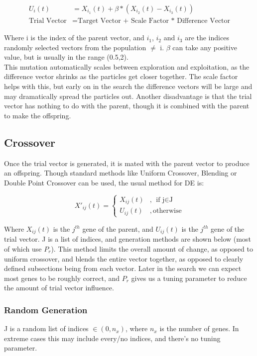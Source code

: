 \begin{align}
    U_i(t) &= X_{i_1}(t) + \beta * (X_{i_2}(t) - X_{i_3}(t)) \\
   \text{Trial Vector} &= \text{Target Vector + Scale Factor * Difference Vector} \nonumber     
\end{align}

Where i is the index of the parent vector, and $i_1$, $i_2$ and $i_3$ are the indices randomly selected vectors from the population $\neq$ i. $\beta$ can take any positive value, but is usually in the range (0.5,2).\\ 
This mutation automatically scales between exploration and exploitation, as the difference vector shrinks as the particles get closer together. The scale factor helps with this, but early on in the search the difference vectors will be large and may dramatically spread the particles out. Another disadvantage is that the trial vector has nothing to do with the parent, though it is combined with the parent to make the offspring.  

\subsection{Crossover}
Once the trial vector is generated, it is mated with the parent vector to produce an offspring. Though standard methods like Uniform Crossover, Blending or Double Point Crossover can be used, the usual method for DE is:

\begin{equation}
    X'_{ij}(t) = 
    \begin{cases}
    X_{ij}(t) &,\, \text{if j$\in$J} \\
    U_{ij}(t) &,\, \text{otherwise}
    \end{cases}
\end{equation}

Where $X_{ij}(t)$ is the $j^{th}$ gene of the parent, and $U_{ij}(t)$ is the $j^{th}$ gene of the trial vector. J is a list of indices, and generation methods are shown below (most of which use $P_r$). This method limits the overall amount of change, as opposed to uniform crossover, and blends the entire vector together, as opposed to clearly defined subsections being from each vector. Later in the search  we can expect most genes to be roughly correct, and $P_r$ gives us a tuning parameter to reduce the amount of trial vector influence.

\subsubsection{Random Generation}
J is a random list of indices $ \in (0, n_x)$, where $n_x$ is the number of genes. In extreme cases this may include every/no indices, and there's no tuning parameter.

